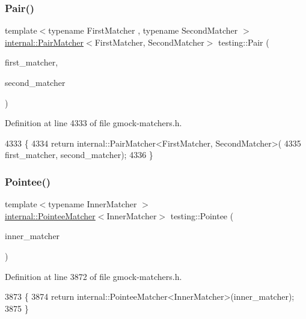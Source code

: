 \subsubsection{\texorpdfstring{Pair()}{Pair()}}
{\footnotesize\ttfamily template$<$typename First\+Matcher , typename Second\+Matcher $>$ \\
\hyperlink{classtesting_1_1internal_1_1PairMatcher}{internal\+::\+Pair\+Matcher}$<$First\+Matcher, Second\+Matcher$>$ testing\+::\+Pair (\begin{DoxyParamCaption}\item[{First\+Matcher}]{first\+\_\+matcher,  }\item[{Second\+Matcher}]{second\+\_\+matcher }\end{DoxyParamCaption})\hspace{0.3cm}{\ttfamily [inline]}}



Definition at line 4333 of file gmock-\/matchers.\+h.


\begin{DoxyCode}
4333                                                                \{
4334   \textcolor{keywordflow}{return} internal::PairMatcher<FirstMatcher, SecondMatcher>(
4335       first\_matcher, second\_matcher);
4336 \}
\end{DoxyCode}
\mbox{\label{namespacetesting_a5122ca3533f3a00f67e146dd81f3b68c}} 
\subsubsection{\texorpdfstring{Pointee()}{Pointee()}}
{\footnotesize\ttfamily template$<$typename Inner\+Matcher $>$ \\
\hyperlink{classtesting_1_1internal_1_1PointeeMatcher}{internal\+::\+Pointee\+Matcher}$<$Inner\+Matcher$>$ testing\+::\+Pointee (\begin{DoxyParamCaption}\item[{const Inner\+Matcher \&}]{inner\+\_\+matcher }\end{DoxyParamCaption})\hspace{0.3cm}{\ttfamily [inline]}}



Definition at line 3872 of file gmock-\/matchers.\+h.


\begin{DoxyCode}
3873                                        \{
3874   \textcolor{keywordflow}{return} internal::PointeeMatcher<InnerMatcher>(inner\_matcher);
3875 \}
\end{DoxyCode}
\mbox{\label{namespacetesting_a51ee81f6f1723f7a7aff0429b1d76ec1}} 
